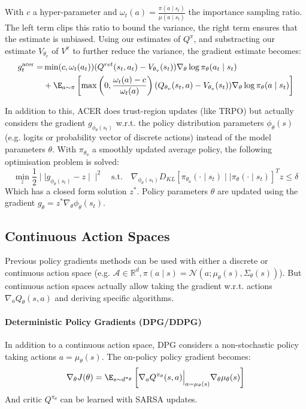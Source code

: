 With $c$ a hyper-parameter and $\omega_t(a) = \frac{\pi(a\mid s_t)}{\mu(a\mid s_t)}$ the importance sampling ratio. The left term clips this ratio to bound the variance, the right term ensures that the estimate is unbiased. Using our estimates of $Q^\pi$, and substracting our estimate $V_{\theta_v}$ of $V^\pi$ to further reduce the variance, the gradient estimate becomes:
\begin{align*}
    g_t^\text{acer} = 
    & \min(c, \omega_t(a_t)) (Q^{ret}(s_t, a_t) - V_{\theta_v}(s_t)) \nabla_\theta \log \pi_\theta(a_t\mid s_t) \\
    &+ \E_{a\sim \pi}\left[
        \max\left(0, \frac{\omega_t(a)-c}{\omega_t(a)}\right) 
        (Q_{\theta_v}(s_t, a) - V_{\theta_v}(s_t)) \nabla_\theta \log \pi_\theta(a\mid s_t)
    \right]
\end{align*}

In addition to this, ACER does trust-region updates (like TRPO) but actually considers the gradient $g_{\phi_\theta(s_t)}$ w.r.t. the policy distribution parameters $\phi_\theta(s)$ (e.g. logits or probability vector of discrete actions) instead of the model parameters $\theta$. With $\pi_{\theta_a}$ a smoothly updated average policy, the following optimisation problem is solved: 
\[
    \min_z \frac{1}{2} \mid \mid g_{\phi_\theta(s_t)} - z\mid \mid ^2 \quad \text{s.t.} \quad
    \nabla_{\phi_\theta(s_t)} D_{KL}[
        \pi_{\theta_a}(\cdot \mid s_t) \mid \mid \pi_\theta(\cdot \mid s_t)
    ]^T z \leq \delta
\]
Which has a closed form solution $z^*$. Policy parameters $\theta$ are updated using the gradient $g_\theta = z^* \nabla_\theta \phi_\theta(s_t)$.


\subsection{Continuous Action Spaces}
Previous policy gradients methods can be used with either a discrete or continuous action space (e.g. $\mathcal{A} \in \mathbb{R}^d, \pi(a\mid s) = \mathcal{N}(a; \mu_\theta(s), \Sigma_\theta(s))$). But continuous action spaces actually allow taking the gradient w.r.t. actions $\nabla_a Q_\theta(s,a)$ and deriving specific algorithms.

\paragraph{Deterministic Policy Gradients (DPG/DDPG)} \cite{silver2014deterministic} \cite{lillicrap2015continuous}
In addition to a continuous action space, DPG considers a non-stochastic policy taking actions $a = \mu_\theta(s)$. The on-policy policy gradient becomes:
\begin{equation}
    \nabla_\theta J(\theta) = \E_{s\sim d^{\pi_\theta}} \left[
        \nabla_a Q^{\pi_\theta}(s,a) \Bigr|_{a=\mu_\theta(s)} \nabla_\theta \mu_\theta(s)
    \right]
\label{eq:ddpg-on-policy}
\end{equation}
And critic $Q^{\pi_\theta}$ can be learned with SARSA updates.

